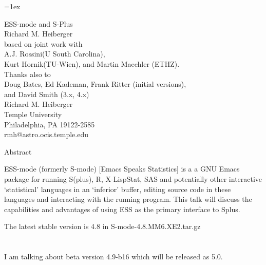 \documentclass[12pt]{article}   %
\begin{document}
\Huge
\parskip=1ex


\begin{center}
\Huge
ESS-mode and S-Plus\\
Richard M. Heiberger\\[1ex]
based on joint work with\\
A.J. Rossini(U South Carolina),\\
 Kurt Hornik(TU-Wien), and Martin Maechler (ETHZ).\\[2ex]
Thanks also to\\
Doug Bates, Ed Kademan, Frank Ritter (initial versions),\\
and David Smith (3.x, 4.x)\\[3ex]

Richard M. Heiberger\\[.4ex]
Temple University\\[.4ex]
Philadelphia, PA 19122-2585\\[.4ex]
{\sf rmh@astro.ocis.temple.edu}\\[2ex]

\end{center}


\newpage
\begin{center}Abstract\end{center}
ESS-mode (formerly S-mode) [Emacs Speaks Statistics] is a a GNU Emacs
package for running S(plus), R, X-LispStat, SAS and potentially other
interactive `statistical' languages in an `inferior' buffer, editing
source code in these languages and interacting with the running
program.  This talk will discuss the capabilities and advantages of
using ESS as the primary interface to Splus.


The latest stable version is 4.8 in {\sf S-mode-4.8.MM6.XE2.tar.gz}\\
\\
\hspace*{2ex}{\sf ftp://wingra.stat.wisc.edu/pub/src/emacs-lisp/}\\
I am talking about beta version 4.9-b16 which will be released as 5.0.\\
\\
\hspace*{2ex}{\sf ftp://ftp.math.sc.edu/rossini/ESS-4.9-b16.tar.gz}


\newpage
\end{document}
